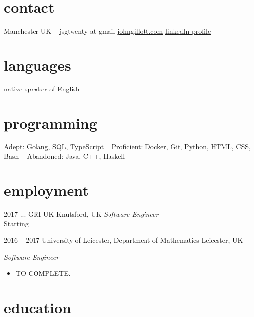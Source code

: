 \documentclass[]{friggeri-cv-a4} %
\begin{document}

\begin{aside} %
\section{contact}
Manchester
UK
~
jsgtwenty at gmail
\href{https://www.johngillott.com/}{johngillott.com}
\href{https://www.linkedin.com/in/johngillott/}{linkedIn profile}
\section{languages}
native speaker of English
\section{programming}
Adept:
Golang, SQL, TypeScript
~
Proficient:
Docker, Git, Python, HTML, CSS, Bash
~
Abandoned:
Java, C++, Haskell
\end{aside}

\section{employment}
\begin{entrylist}

\entry
{2017 ...}
{GRI UK}
{Knutsford, UK}
{\emph{Software Engineer} \\
Starting
}

\entry
{2016 -- 2017}
{University of Leicester, Department of Mathematics}
{Leicester, UK}
{\emph{Software Engineer} \\
\begin{itemize}
\item TO COMPLETE.
\end{itemize}
}

\end{entrylist}

\section{education}

\newpage
\end{document}
